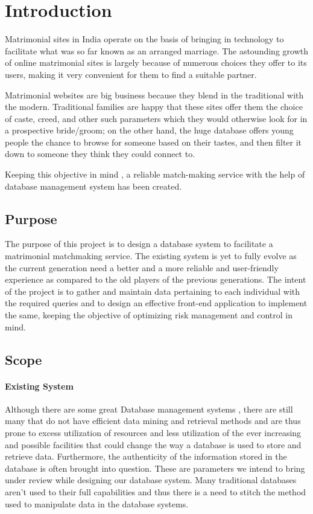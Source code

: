 \documentclass[12pt]{report}
\begin{document}
\chapter{Introduction}\label{ch:introduction}
Matrimonial sites in India operate on the basis of bringing in technology to facilitate what was so far known as an arranged marriage. The astounding growth of online matrimonial sites is largely because of numerous choices they offer to its users, making it very convenient for them to find a suitable partner.

Matrimonial websites are big business because they blend in the traditional with the modern. Traditional families are happy that these sites offer them the choice of caste, creed, and other such parameters which they would otherwise look for in a prospective bride/groom; on the other hand, the huge database offers young people the chance to browse for someone based on their tastes, and then filter it down to someone they think they could connect to.

Keeping this objective in mind , a reliable match-making service with the help of database management system has been created.




\section{Purpose}
The purpose of this project is to design a database system to facilitate a matrimonial matchmaking service. The existing system is yet to fully evolve as the current generation need a better and a more reliable and user-friendly experience as compared to the old players of the previous generations. 
The intent of the project is to gather and maintain data pertaining to each individual with the required queries and to design an effective front-end application to implement the same, keeping the objective of optimizing risk management and control in mind. 


\section{Scope}
\subsubsection*{Existing System}
Although there are some great Database management systems , there are still many that do not have  efficient data mining and retrieval methods and are thus prone to excess utilization of resources and less utilization of the ever increasing and possible facilities that could change the way a database is used to store and retrieve data. Furthermore, the authenticity of the information stored in the database is often brought into question. These are parameters we intend to bring under review while designing our database system. Many traditional databases aren’t used to their full capabilities and thus there is a need to stitch the method used to manipulate data in the database systems.
\end{document}
